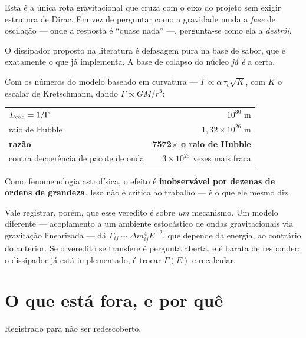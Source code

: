 Esta é a única rota gravitacional que cruza com o eixo do projeto sem exigir
estrutura de Dirac. Em vez de perguntar como a gravidade muda a \emph{fase} de
oscilação --- onde a resposta é ``quase nada'' ---, pergunta-se como ela a
\emph{destrói}.

O dissipador proposto na literatura é defasagem pura na base de sabor, que é
exatamente o que  já implementa. A base de colapso do
núcleo \emph{já é} a certa.

\begin{alerta}
Com os números do modelo baseado em curvatura --- $\Gamma \propto \alpha\,
\tau_c\sqrt{K}$, com $K$ o escalar de Kretschmann, dando $\Gamma \propto GM/r^3$:
\begin{center}
\begin{tabular}{@{}>{\small}l >{\small}r@{}}
$L_{\rm coh} = 1/\Gamma$ & $10^{30}$ m \\
raio de Hubble & $1{,}32\times10^{26}$ m \\
\textbf{razão} & \textbf{7572$\times$ o raio de Hubble} \\
contra decoerência de pacote de onda & $3\times10^{25}$ vezes mais fraca \\
\end{tabular}
\end{center}
Como fenomenologia astrofísica, o efeito é \textbf{inobservável por dezenas de
ordens de grandeza}. Isso não é crítica ao trabalho --- é o que ele mesmo diz.
\end{alerta}

Vale registrar, porém, que esse veredito é sobre \emph{um} mecanismo. Um modelo
diferente --- acoplamento a um ambiente estocástico de ondas gravitacionais via
gravitação linearizada --- dá $\Gamma_{ij}\sim \Delta m^4_{ij} E^{-2}$, que
depende da energia, ao contrário do anterior. Se o veredito se transfere é
pergunta aberta, e é barata de responder: o dissipador já está implementado, é
trocar $\Gamma(E)$ e recalcular.

\section{O que está fora, e por quê}

Registrado para não ser redescoberto.

